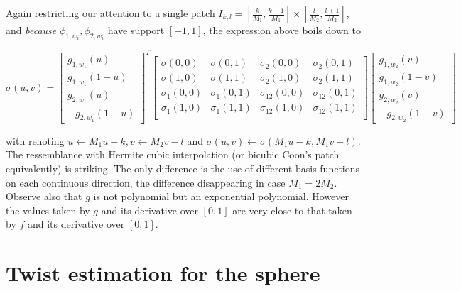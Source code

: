 \documentclass[a4paper, 11pt]{article}
\begin{document}
Again restricting our attention to a single patch $I_{k,l} = [\frac{k}{M_1}, \frac{k+1}{M_1}]\times[\frac{l}{M_2}, 
\frac{l+1}{M_2}]$, and \emph{because} $\phi_{1,w_i}, \phi_{2, w_i}$ have support $[-1,1]$, the expression above boils 
down to

\begin{equation}
  \boxed{\sigma(u, v) = \begin{bmatrix} g_{1, w_1}(u) \\ g_{1, w_1}(1-u) \\ g_{2, w_1}(u) \\ - g_{2, w_1}(1-u) 
    \end{bmatrix}^T
  \begin{bmatrix}
    \sigma(0,0) & \sigma(0,1) & \sigma_2(0,0) & \sigma_2(0,1) \\
    \sigma(1,0) & \sigma(1,1) & \sigma_2(1,0) & \sigma_2(1,1) \\
    \sigma_1(0,0) & \sigma_1(0,1) & \sigma_{12}(0,0) & \sigma_{12}(0,1) \\
    \sigma_1(1,0) & \sigma_1(1,1) & \sigma_{12}(1,0) & \sigma_{12}(1,1) \\
  \end{bmatrix}
  \begin{bmatrix} g_{1, w_2}(v) \\ g_{1, w_2}(1-v) \\ g_{2, w_2}(v) \\ - g_{2, w_2}(1-v) \end{bmatrix}}
\end{equation}

with renoting $u \leftarrow M_1u-k, v \leftarrow M_2v-l$ and $\sigma(u,v) \leftarrow \sigma(M_1u-k, M_1v-l)$. \\

The ressemblance with Hermite cubic interpolation (or bicubic Coon's patch equivalently) is striking. The only 
difference is the use of different basis functions on each continuous direction, the difference disappearing in case 
$M_1 = 2M_2$. Observe also that $g$ is not polynomial but an exponential polynomial. However the values taken by $g$ and 
its derivative over $[0,1]$ are very close to that taken by $f$ and its derivative over $[0,1]$.

\clearpage

\section{Twist estimation for the sphere}
\end{document}
